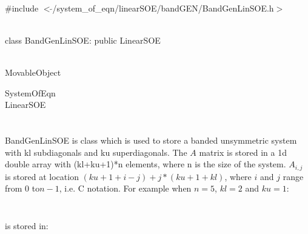 
   \\
\#include $<\tilde{ }$/system\_of\_eqn/linearSOE/bandGEN/BandGenLinSOE.h$>$  


  \\
class BandGenLinSOE: public LinearSOE 


 \\
MovableObject 

\indent\indent SystemOfEqn \\
\indent\indent\indent LinearSOE \\
\indent\indent\indent{} \\

  \\
\indent BandGenLinSOE is class which is used to store a banded
unsymmetric system with kl subdiagonals and ku superdiagonals. The $A$
matrix is stored in a 1d double array with (kl+ku+1)*n elements, where
n is the size of the system. $A_{i,j}$ is stored at location
$(ku+1+i-j) + j*(ku+1+kl)$, where $i$ and $j$ range from $0$ to$n-1$, i.e. C
notation. For example when $n=5$, $kl = 2$ and $ku=1$: 


$$

$$


$$

$$


is stored in:


$$

$$


